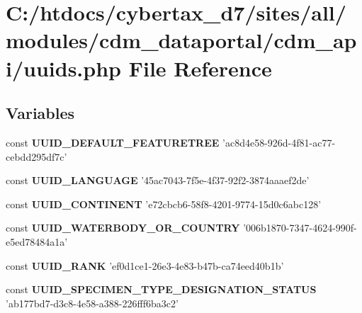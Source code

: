 \hypertarget{uuids_8php}{\section{C\-:/htdocs/cybertax\-\_\-d7/sites/all/modules/cdm\-\_\-dataportal/cdm\-\_\-api/uuids.php File Reference}
\label{uuids_8php}
}
\subsection*{Variables}
\begin{DoxyCompactItemize}
\item 
\hypertarget{uuids_8php_a1c9faf904582fe36f57b394f4f957529}{const {\bfseries U\-U\-I\-D\-\_\-\-D\-E\-F\-A\-U\-L\-T\-\_\-\-F\-E\-A\-T\-U\-R\-E\-T\-R\-E\-E} 'ac8d4e58-\/926d-\/4f81-\/ac77-\/cebdd295df7c'}\label{uuids_8php_a1c9faf904582fe36f57b394f4f957529}

\item 
\hypertarget{uuids_8php_a409a59962ea0618948f71f67a3fb7d20}{const {\bfseries U\-U\-I\-D\-\_\-\-L\-A\-N\-G\-U\-A\-G\-E} '45ac7043-\/7f5e-\/4f37-\/92f2-\/3874aaaef2de'}\label{uuids_8php_a409a59962ea0618948f71f67a3fb7d20}

\item 
\hypertarget{uuids_8php_a70a7b85bd8c56646b7a0f51a4a6ab0dd}{const {\bfseries U\-U\-I\-D\-\_\-\-C\-O\-N\-T\-I\-N\-E\-N\-T} 'e72cbcb6-\/58f8-\/4201-\/9774-\/15d0c6abc128'}\label{uuids_8php_a70a7b85bd8c56646b7a0f51a4a6ab0dd}

\item 
\hypertarget{uuids_8php_a83fac5394c87faabb201ba742654cc4e}{const {\bfseries U\-U\-I\-D\-\_\-\-W\-A\-T\-E\-R\-B\-O\-D\-Y\-\_\-\-O\-R\-\_\-\-C\-O\-U\-N\-T\-R\-Y} '006b1870-\/7347-\/4624-\/990f-\/e5ed78484a1a'}\label{uuids_8php_a83fac5394c87faabb201ba742654cc4e}

\item 
\hypertarget{uuids_8php_a576bcb2f94db137101ad67b54e005e51}{const {\bfseries U\-U\-I\-D\-\_\-\-R\-A\-N\-K} 'ef0d1ce1-\/26e3-\/4e83-\/b47b-\/ca74eed40b1b'}\label{uuids_8php_a576bcb2f94db137101ad67b54e005e51}

\item 
\hypertarget{uuids_8php_ab1a23a6c5c955dde86ac02278ca7547e}{const {\bfseries U\-U\-I\-D\-\_\-\-S\-P\-E\-C\-I\-M\-E\-N\-\_\-\-T\-Y\-P\-E\-\_\-\-D\-E\-S\-I\-G\-N\-A\-T\-I\-O\-N\-\_\-\-S\-T\-A\-T\-U\-S} 'ab177bd7-\/d3c8-\/4e58-\/a388-\/226fff6ba3c2'}\label{uuids_8php_ab1a23a6c5c955dde86ac02278ca7547e}


\end{DoxyCompactItemize}

